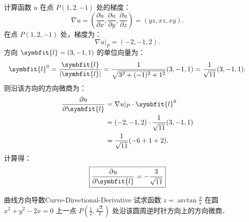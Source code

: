 \begin{solution}
    计算函数 $u$ 在点 $P(1, 2, -1)$ 处的梯度：
    \begin{equation}
        \nabla u = \left( \frac{\partial u}{\partial x}, \frac{\partial u}{\partial y}, \frac{\partial u}{\partial z} \right) = (yz, xz, xy).
    \end{equation}
    在点 $P(1, 2, -1)$ 处，梯度为：
    \begin{equation}
        \nabla u|_{P} = (-2, -1, 2).
    \end{equation}
    方向 $\symbfit{l} = (3, -1, 1)$ 的单位向量为：
    \begin{equation}
        \symbfit{l}^0 = \frac{\symbfit{l}}{|\symbfit{l}|} = \frac{1}{\sqrt{3^2 + (-1)^2 + 1^2}}(3, -1, 1) = \frac{1}{\sqrt{11}}(3, -1, 1).
    \end{equation}
    则沿该方向的方向微商为：
    \begin{equation}
        \begin{aligned}
            \frac{\partial u}{\partial \symbfit{l}} & = \nabla u|_{P} \cdot \symbfit{l}^0               \\
                                                    & = (-2, -1, 2) \cdot \frac{1}{\sqrt{11}}(3, -1, 1) \\
                                                    & = \frac{1}{\sqrt{11}}(-6 + 1 + 2).
        \end{aligned}
    \end{equation}
    计算得：
    \begin{equation}
        \boxed{\frac{\partial u}{\partial \symbfit{l}} = -\frac{3}{\sqrt{11}}}
    \end{equation}
\end{solution}


\begin{problem}{曲线方向导数}{Curve-Directional-Derivative}
    试求函数 $z = \arctan \frac{y}{x}$ 在圆 $x^2 + y^2 - 2x = 0$ 上一点 $P\left(\frac{1}{2}, \frac{\sqrt{3}}{2}\right)$ 处沿该圆周逆时针方向上的方向微商．
\end{problem}

